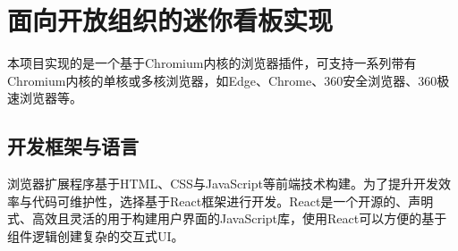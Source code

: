 \section{面向开放组织的迷你看板实现}
\par 本项目实现的是一个基于Chromium内核的浏览器插件，可支持一系列带有Chromium内核的单核或多核浏览器，如Edge、Chrome、360安全浏览器、360极速浏览器等。

\subsection{开发框架与语言}
\par 浏览器扩展程序基于HTML、CSS与JavaScript等前端技术构建。为了提升开发效率与代码可维护性，选择基于React框架进行开发。React是一个开源的、声明式、高效且灵活的用于构建用户界面的JavaScript库，使用React可以方便的基于组件逻辑创建复杂的交互式UI。
